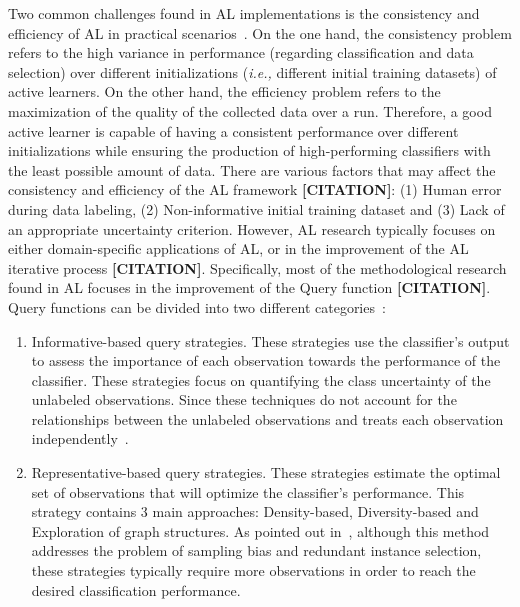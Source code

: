 \documentclass[parskip=full]{scrartcl}
\begin{document}
Two common challenges found in AL implementations is the consistency and
efficiency of AL in practical scenarios~\cite{Kottke2017}. On the one hand,
the consistency problem refers to the high variance in performance (regarding
classification and data selection) over different initializations
(\textit{i.e.,} different initial training datasets) of active learners. On
the other hand, the efficiency problem refers to the maximization of the
quality of the collected data over a run. Therefore, a good active learner is
capable of having a consistent performance over different initializations
while ensuring the production of high-performing classifiers with the least
possible amount of data. There are various factors that may affect the
consistency and efficiency of the AL framework \textbf{[CITATION]}: (1) Human
error during data labeling, (2) Non-informative initial training dataset and
(3) Lack of an appropriate uncertainty criterion. However, AL research
typically focuses on either domain-specific applications of AL, or in the
improvement of the AL iterative process \textbf{[CITATION]}. Specifically,
most of the methodological research found in AL focuses in the improvement of
the Query function \textbf{[CITATION]}. Query functions can be divided into
two different categories~\cite{Gu2021, Kumar2020}: 

\begin{enumerate}

    \item Informative-based query strategies. These strategies use the
        classifier's output to assess the importance of each observation
        towards the performance of the classifier. These strategies focus on
        quantifying the class uncertainty of the unlabeled observations.
        Since these techniques do not account for the relationships between
        the unlabeled observations and treats each observation
        independently~\cite{Fu2013}.

    \item Representative-based query strategies. These strategies estimate the
        optimal set of observations that will optimize the classifier's
        performance. This strategy contains 3 main approaches: Density-based,
        Diversity-based and Exploration of graph structures. As pointed out
        in~\cite{Kumar2020}, although this method addresses the problem of
        sampling bias and redundant instance selection, these strategies
        typically require more observations in order to reach the desired
        classification performance.

\end{enumerate}
\end{document}
